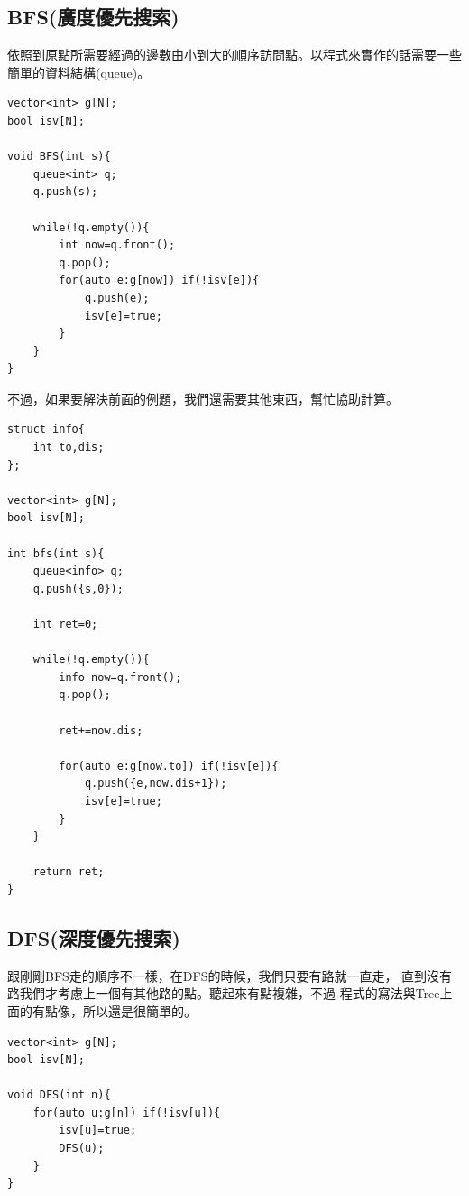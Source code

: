     \subsection{BFS(廣度優先搜索)}
    
    依照到原點所需要經過的邊數由小到大的順序訪問點。以程式來實作的話需要一些簡單的資料結構(queue)。

\begin{lstlisting}[caption=圖的BFS]
vector<int> g[N];
bool isv[N];

void BFS(int s){
    queue<int> q;
    q.push(s);
    
    while(!q.empty()){
        int now=q.front();
        q.pop();
        for(auto e:g[now]) if(!isv[e]){
            q.push(e);
            isv[e]=true;
        }
    }
}
\end{lstlisting}

    不過，如果要解決前面的例題，我們還需要其他東西，幫忙協助計算。

\begin{lstlisting}[caption=圖基本問題題解]
struct info{
    int to,dis;
};
    
vector<int> g[N];
bool isv[N];
    
int bfs(int s){
    queue<info> q;
    q.push({s,0});
    
    int ret=0;
    
    while(!q.empty()){
        info now=q.front();
        q.pop();
        
        ret+=now.dis;
        
        for(auto e:g[now.to]) if(!isv[e]){
            q.push({e,now.dis+1});
            isv[e]=true;
        }
    }
    
    return ret;
}
\end{lstlisting}

    \subsection{DFS(深度優先搜索)}
    跟剛剛BFS走的順序不一樣，在DFS的時候，我們只要有路就一直走，
    直到沒有路我們才考慮上一個有其他路的點。聽起來有點複雜，不過
    程式的寫法與Tree上面的有點像，所以還是很簡單的。

\begin{lstlisting}[caption=圖基本問題題解]
vector<int> g[N];
bool isv[N];
 
void DFS(int n){
    for(auto u:g[n]) if(!isv[u]){
        isv[u]=true;
        DFS(u);
    }
}
\end{lstlisting}

